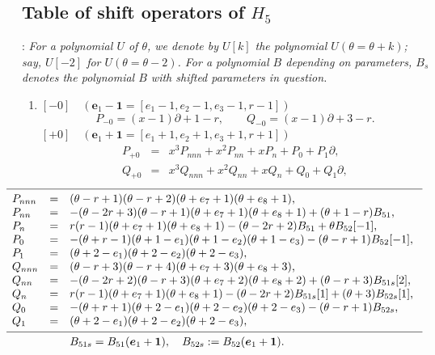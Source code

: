 \documentclass[a4paper,12pt]{article}
\theoremstyle{definition}
\theoremstyle{remark}
\numberwithin{equation}{section} %
\begin{document}
\subsection{Table of shift operators of $H_5$}\label{AppenE5} %
: {\it For a polynomial $U$ of $\theta$,
we denote by $U[k]$ the polynomial $U(\theta=\theta+k)$; say, $U[-2]$ for
$U(\theta=\theta-2)$. For a polynomial $B$ depending on parameters, $B_s$ denotes
the polynomial $B$ with shifted parameters in question.
}
\renewcommand{\labelenumi}{(\ref{AppenE5}.\arabic{enumi})}
\begin{enumerate}
\item $[-0]\quad({\bm e}_1-{\bm 1} =[e_1-1,e_2-1,e_3-1,r-1])$
\[P_{-0} = (x-1)\partial +1-r,\qquad Q_{-0} = (x-1)\partial +3-r.\]
$[+0]\quad({\bm e}_1+{\bm 1}=[e_1+1,e_2+1,e_3+1,r+1])$
\[\begin{array}{rcl}
P_{+0}&=&x^3P_{nnn}+x^2P_{nn}+xP_n+P_0+P_1\partial,\\ [1mm]
Q_{+0}&=&x^3Q_{nnn}+x^2Q_{nn}+xQ_n+Q_0+Q_1\partial,
\end{array}\]
\[
\hskip-36pt
\begin{array}{lcp{10.8cm}}\hline\noalign{\smallskip}  
  P_{nnn} &=&$(\theta-r+1)(\theta-r+2)(\theta+e_7+1)(\theta+e_8+1)$, \\
  P_{nn} &=& $-(\theta-2r+3)(\theta-r+1)(\theta+e_7+1)(\theta+e_8+1)+(\theta+1-r)B_{51}$,  \\
  P_{n} &=& $r(r-1)(\theta+e_7+1)(\theta+e_8+1) - (\theta-2r+2)B_{51} + \theta B_{52}[-1]$,  \\
  P_{0}&=& $-(\theta+r-1)(\theta+1-e_1)(\theta+1-e_2)(\theta+1-e_3)-(\theta-r+1)B_{52}[-1]$,  \\
  P_{1}&=& $(\theta+2-e_1)(\theta+2-e_2)(\theta+2-e_3)$,  \\
  Q_{nnn} &=& $(\theta-r+3)(\theta-r+4)(\theta+e_7+3)(\theta+e_8+3)$, \\
  Q_{nn} &=& $-(\theta-2r+2)(\theta-r+3)(\theta+e_7+2)(\theta+e_8+2)+(\theta-r+3)B_{51s}[2]$, \\
  Q_{n} &=& $r(r-1)(\theta+e_7+1)(\theta+e_8+1) - (\theta-2r+2)B_{51s}[1] + (\theta+3)B_{52s}[1]$, \\
  Q_{0} &=& $-(\theta+r+1)(\theta+2-e_1)(\theta+2-e_2)(\theta+2-e_3)-(\theta-r+1)B_{52s}$, \\
  Q_{1}&=& $ (\theta+2-e_1)(\theta+2-e_2)(\theta+2-e_3)$, \\
\noalign{\smallskip}  \hline \noalign{\smallskip}  
&& $B_{51s}=B_{51}({\bm e}_1+{\bm 1}),\quad B_{52s}:=B_{52}({\bm e}_1+{\bm 1})$.
\end{array} \]


\end{enumerate}
\end{document}
